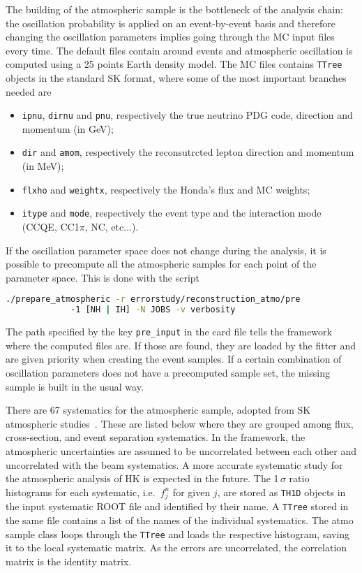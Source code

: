 \documentclass[a4paper, 11pt]{article}
\begin{document}
The building of the atmospheric sample is the bottleneck of the analysis chain: %
the oscillation probability is applied on an event-by-event basis and therefore changing %
the oscillation parameters implies going through the MC input files every time.
The default files contain around  events and atmospheric oscillation is computed using %
a 25 points Earth density model.
The MC files contains \texttt{TTree} objects in the standard SK format, where some of the most important branches needed are
\begin{itemize}
	\item \texttt{ipnu}, \texttt{dirnu} and \texttt{pnu}, respectively the true neutrino PDG code, direction and momentum (in GeV);
	\item \texttt{dir} and \texttt{amom}, respectively the reconsutrcted lepton direction and momentum (in MeV);
	\item \texttt{flxho} and \texttt{weightx}, respectively the Honda's flux and MC weights;
	\item \texttt{itype} and \texttt{mode}, respectively the event type and the interaction mode (CCQE, CC1$\pi$, NC, etc...).
\end{itemize}

If the oscillation parameter space does not change during the analysis, it is possible to precompute %
all the atmospheric samples for each point of the parameter space.
This is done with the script
\begin{lstlisting}[language=bash]
   ./prepare_atmospheric -r errorstudy/reconstruction_atmo/pre
   			 -1 [NH | IH] -N JOBS -v verbosity
\end{lstlisting}
The path specified by the key \texttt{pre\_input} in the card file tells the framework where %
the computed files are.
If those are found, they are loaded by the fitter and are given priority when %
creating the event samples.
If a certain combination of oscillation parameters does not have a precomputed sample set, %
the missing sample is built in the usual way.


There are 67 systematics for the atmospheric sample, adopted from SK atmospheric studies~\cite{Abe:2017aap}.
These are listed below where they are grouped among flux, cross-section, and %
event separation systematics.
In the framework, the atmospheric uncertainties are assumed to be uncorrelated between each other and uncorrelated with the beam systematics.
A more accurate systematic study for the atmospheric analysis of HK is expected in the future.
The 1\,$\sigma$ ratio histograms for each systematic, i.e.\ $f^n_j$ for given $j$, are stored as \texttt{TH1D} %
objects in the input systematic ROOT file and identified by their name.
A \texttt{TTree} stored in the same file contains a list of the names of the individual systematics.
The atmo sample class loops through the \texttt{TTree} and loads the respective histogram, saving it to the %
local systematic matrix.
As the errors are uncorrelated, the correlation matrix is the identity matrix.
\end{document}
